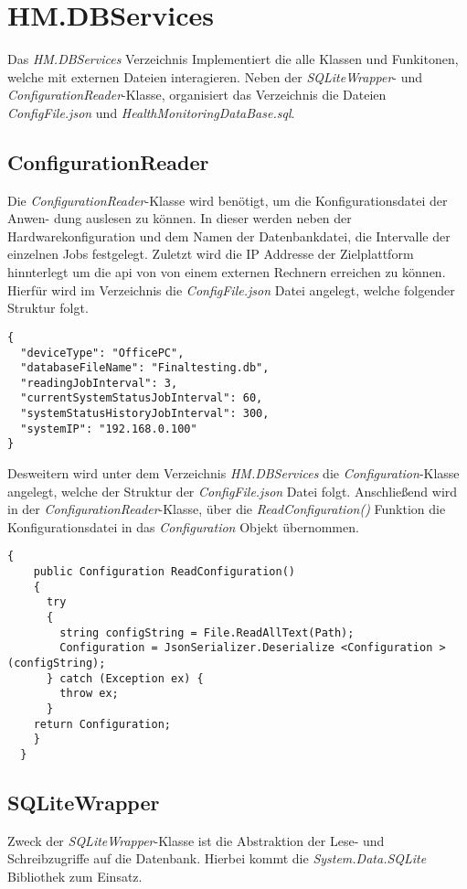 \newpage
\section{HM.DBServices}\label{sec:HMDBServices}
Das \textit{HM.DBServices} Verzeichnis Implementiert die alle Klassen und Funkitonen, welche mit externen Dateien interagieren. Neben der \textit{SQLiteWrapper}- und \textit{ConfigurationReader}-Klasse, organisiert das Verzeichnis die Dateien \textit{ConfigFile.json} und \textit{HealthMonitoringDataBase.sql}.

\subsection*{ConfigurationReader}
Die \textit{ConfigurationReader}-Klasse wird benötigt, um die Konfigurationsdatei der Anwen- dung auslesen zu können. In dieser werden neben der Hardwarekonfiguration und dem Namen der Datenbankdatei, die Intervalle der einzelnen Jobs festgelegt. Zuletzt wird die IP Addresse der Zielplattform hinnterlegt um die \ac{api} von von einem externen Rechnern erreichen zu können.
Hierfür wird im Verzeichnis die \textit{ConfigFile.json} Datei angelegt, welche folgender Struktur folgt.
\begin{lstlisting}[caption={Konfigurationsdatei der Hardware-Health-Monitor Anwendung}, label={lst:ConfigFileStrukture}]
{
  "deviceType": "OfficePC",
  "databaseFileName": "Finaltesting.db",
  "readingJobInterval": 3,
  "currentSystemStatusJobInterval": 60,
  "systemStatusHistoryJobInterval": 300,
  "systemIP": "192.168.0.100"
}
\end{lstlisting}
Desweitern wird unter dem Verzeichnis \textit{HM.DBServices} die \textit{Configuration}-Klasse angelegt, welche der Struktur der \textit{ConfigFile.json} Datei folgt. Anschließend wird in der \textit{ConfigurationReader}-Klasse, über die \textit{ReadConfiguration()} Funktion die Konfigurationsdatei in das \textit{Configuration} Objekt übernommen.
\begin{lstlisting}[caption={\textit{ReadConfiguration()} Funktion der \textit{ConfigurationReader}-Klasse}, label={lst:ReadConfiguration}]
  {
    public Configuration ReadConfiguration()
    {
      try
      {
        string configString = File.ReadAllText(Path);    
        Configuration = JsonSerializer.Deserialize <Configuration >(configString);
      } catch (Exception ex) {
        throw ex; 
      }
    return Configuration;
    }
  }
  \end{lstlisting}

  \subsection*{SQLiteWrapper}
  Zweck der \textit{SQLiteWrapper}-Klasse ist die Abstraktion der Lese- und Schreibzugriffe auf die Datenbank. Hierbei kommt die \textit{System.Data.SQLite} Bibliothek zum Einsatz.